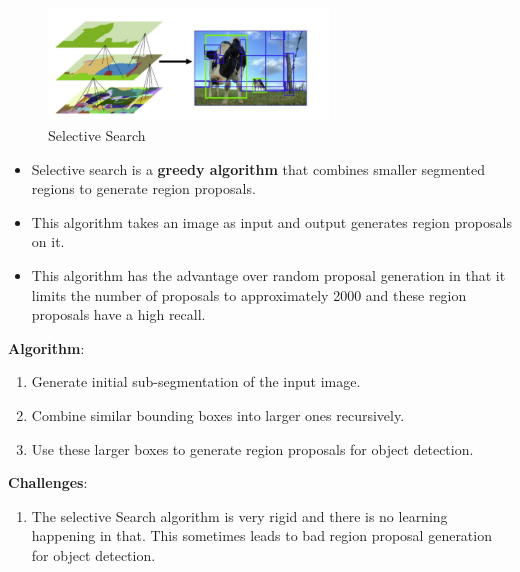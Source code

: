 \begin{table}[h]
    \begin{minipage}[t]{0.39\linewidth}
        \begin{figure}[H]
            \centering
            \includegraphics[width=\linewidth, height=3cm, keepaspectratio]{Pictures/convolutional-neural-network/rcnn-selective-search.png}
            \caption{Selective Search}
        \end{figure}        
    \end{minipage}
    \hfill
    \begin{minipage}[t]{0.59\linewidth}
        \begin{itemize}
            \item Selective search is a \textbf{greedy algorithm} that combines smaller segmented regions to generate region proposals.
            
            \item This algorithm takes an image as input and output generates region proposals on it.
        
            \item This algorithm has the advantage over random proposal generation in that it limits the number of proposals to approximately 2000 and these region proposals have a high recall.
        \end{itemize}    
    \end{minipage}
\end{table}


\vspace{0.2cm}
\textbf{Algorithm}:
\begin{enumerate}
    \item Generate initial sub-segmentation of the input image.

    \item Combine similar bounding boxes into larger ones recursively.

    \item Use these larger boxes to generate region proposals for object detection.
\end{enumerate}

\vspace{0.2cm}
\textbf{Challenges}:
\begin{enumerate}
    \item The selective Search algorithm is very rigid and there is no learning happening in that. This sometimes leads to bad region proposal generation for object detection.
\end{enumerate}
































